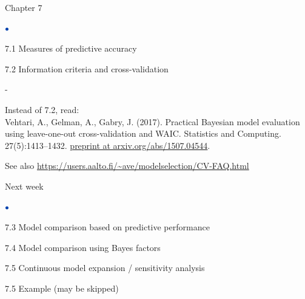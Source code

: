 \documentclass[english,t]{beamer}
\newenvironment{list1}{
   \begin{list}{$\color{list1}\bullet$}{\itemsep=6pt}}{
  \end{list}}
\newenvironment{list2}{
  \begin{list}{-}{\baselineskip=12pt\itemsep=2pt}}{
  \end{list}}
\begin{document}
\begin{frame}{Chapter 7}

  \vspace{-\baselineskip}
   \begin{list1}
   \item 7.1 Measures of predictive accuracy
   \item {\color{gray} 7.2 Information criteria and cross-validation}
     \begin{list2}
     \item Instead of 7.2, read:\\
       Vehtari, A., Gelman, A., Gabry, J. (2017). Practical Bayesian
       model evaluation using leave-one-out cross-validation and
       WAIC. Statistics and Computing. 27(5):1413–1432.
       \href{http://arxiv.org/abs/1507.04544}{preprint at arxiv.org/abs/1507.04544}.
     \item See also \url{https://users.aalto.fi/~ave/modelselection/CV-FAQ.html}

     \end{list2}
     \end{list1}
Next week
   \begin{list1}
 \item 7.3 Model comparison based on predictive performance\\
   \item 7.4 Model comparison using Bayes factors\\
   \item 7.5 Continuous model expansion / sensitivity analysis
   \item {\color{gray}7.5 Example (may be skipped)}
   \end{list1}

\end{frame}


\end{document}
